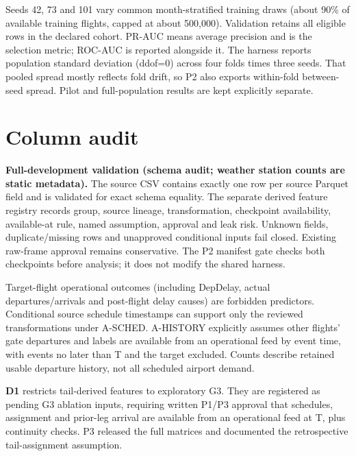 \documentclass{article}
\begin{document}
Seeds 42, 73 and 101 vary common month-stratified training draws (about 90\% of available training flights, capped at about 500,000). Validation retains all eligible rows in the declared cohort. PR-AUC means average precision and is the selection metric; ROC-AUC is reported alongside it. The harness reports population standard deviation (ddof=0) across four folds times three seeds. That pooled spread mostly reflects fold drift, so P2 also exports within-fold between-seed spread. Pilot and full-population results are kept explicitly separate.
\section{Column audit}
\textbf{Full-development validation (schema audit; weather station counts are static metadata).}
The source CSV contains exactly one row per source Parquet field and is validated for exact schema equality. The separate derived feature registry records group, source lineage, transformation, checkpoint availability, available-at rule, named assumption, approval and leak risk. Unknown fields, duplicate/missing rows and unapproved conditional inputs fail closed. Existing raw-frame approval remains conservative. The P2 manifest gate checks both checkpoints before analysis; it does not modify the shared harness.

Target-flight operational outcomes (including DepDelay, actual departures/arrivals and post-flight delay causes) are forbidden predictors. Conditional source schedule timestamps can support only the reviewed transformations under A-SCHED. A-HISTORY explicitly assumes other flights' gate departures and labels are available from an operational feed by event time, with events no later than T and the target excluded. Counts describe retained usable departure history, not all scheduled airport demand.

\textbf{D1} restricts tail-derived features to exploratory G3. They are registered as pending G3 ablation inputs, requiring written P1/P3 approval that schedules, assignment and prior-leg arrival are available from an operational feed at T, plus continuity checks. P3 released the full matrices and documented the retrospective tail-assignment assumption.
\end{document}
